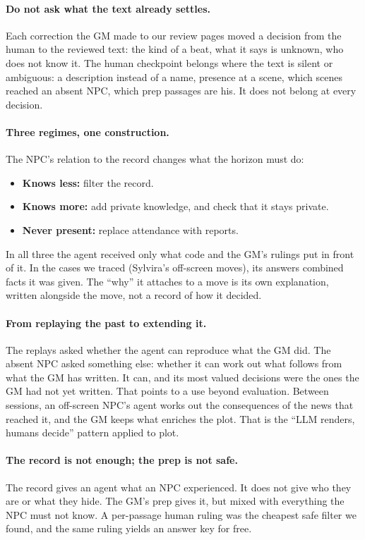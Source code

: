 \documentclass[11pt]{article}
\begin{document}
\paragraph{Do not ask what the text already settles.}
Each correction the GM made to our review pages moved a decision from the human to
the reviewed text: the kind of a beat, what it says is unknown, who does not know it.
The human checkpoint belongs where the text is silent or ambiguous: a description
instead of a name, presence at a scene, which scenes reached an absent NPC, which prep
passages are his. It does not belong at every decision.

\paragraph{Three regimes, one construction.}
The NPC's relation to the record changes what the horizon must do:
\begin{itemize}[nosep]
\item \textbf{Knows less:} filter the record.
\item \textbf{Knows more:} add private knowledge, and check that it stays private.
\item \textbf{Never present:} replace attendance with reports.
\end{itemize}
In all three the agent received only what code and the GM's rulings put in front of
it. In the cases we traced (Sylvira's off-screen moves), its answers combined facts
it was given. The ``why''
it attaches to a move is its own explanation, written alongside the move, not a
record of how it decided.

\paragraph{From replaying the past to extending it.}
The replays asked whether the agent can reproduce what the GM did. The absent NPC
asked something else: whether it can work out what follows from what the GM has
written. It can, and its most valued decisions were the ones the GM had not yet
written. That points to a use beyond evaluation. Between sessions, an off-screen NPC's
agent works out the consequences of the news that reached it, and the GM keeps what
enriches the plot. That is the ``LLM renders, humans decide'' pattern applied to
plot.

\paragraph{The record is not enough; the prep is not safe.}
The record gives an agent what an NPC experienced. It does not give who they are or
what they hide. The GM's prep gives it, but mixed with everything the NPC must not
know. A per-passage human ruling was the cheapest safe filter we found, and the same
ruling yields an answer key for free.
\end{document}

